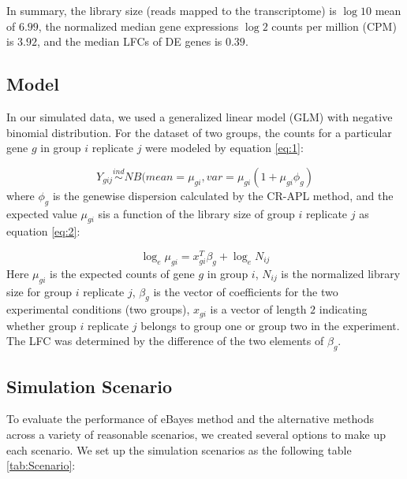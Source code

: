 In summary, the library size (reads mapped to the transcriptome) is $\log{10}$ mean of $6.99$, the normalized median gene expressions $\log{2}$ counts per million (CPM) is $3.92$, and the median LFCs of DE genes is $0.39$. 


\subsection{Model}

In our simulated data, we used a generalized linear model (GLM) with negative binomial distribution. For the dataset of two groups, the counts for a particular gene $g$ in group $i$ replicate $j$ were modeled by equation \ref{eq:1}:

\begin{equation}
\label{eq:1}
Y_{gij} \stackrel{ind}{\sim} NB(mean = \mu_{gi}, var = \mu_{gi}(1+\mu_{gi}\phi_{g})
\end{equation}
where $\phi_g$ is the genewise dispersion calculated by the CR-APL method, and the expected value $\mu_{gi}$ sis a function of the library size of group $i$ replicate $j$ as equation \ref{eq:2}:

\begin{equation}
\label{eq:2}
\log_e \mu_{gi} = x_{gi}^T \beta_g + \log_e N_{ij}
\end{equation}
Here $\mu_{gi}$ is the expected counts of gene $g$ in group $i$, $N_{ij}$ is the normalized library size for group $i$ replicate $j$, $\beta_g$ is the vector of coefficients for the two experimental conditions (two groups), $x_{gi}$ is a vector of length $2$ indicating whether group $i$ replicate $j$ belongs to group one or group two in the experiment. The LFC was determined by the difference of the two elements of $\beta_g$. 



\subsection{Simulation Scenario}

To evaluate the performance of eBayes method and the alternative methods across a variety of reasonable scenarios, we created several options to make up each scenario. We set up the simulation scenarios as the following table \ref{tab:Scenario}:


